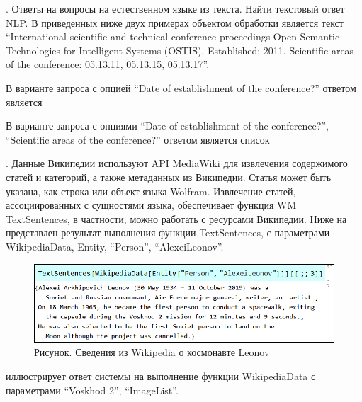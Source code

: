 .
Ответы на вопросы на естественном языке из текста. Найти текстовый ответ NLP. 
В приведенных ниже двух примерах объектом обработки является текст ``International scientific and technical conference proceedings Open Semantic Technologies for Intelligent Systems (OSTIS). Established: 2011. Scientific areas of the conference: 05.13.11, 05.13.15, 05.13.17''.

В варианте запроса с опцией ``Date of establishment of the conference?'' ответом является
\begin{center}
\end{center}
В варианте запроса с опциями ``Date of establishment of the conference?'', ``Scientific areas of the conference?'' ответом является список 
\begin{center}
\end{center}

.
Данные Википедии используют API MediaWiki для извлечения содержимого статей и категорий, а также метаданных из Википедии. Статья может быть указана, как строка или объект языка Wolfram. 
Извлечение статей, ассоциированных с сущностями языка, обеспечивает функция WM TextSentences, в частности, можно работать с ресурсами Википедии. 
Ниже на \textit{} представлен результат выполнения функции TextSentences, с параметрами WikipediaData, Entity, ``Person'', ``AlexeiLeonov''.
 
\begin{figure}[H]
	\centering
	\includegraphics[scale=0.55]{images/part7/chapter_integration/integr_alg6.png}
	\caption{Рисунок. Сведения из Wikipedia о космонавте Leonov}
	\label{fig:integr_alg6}
\end{figure}

\textit{} иллюстрирует ответ системы на выполнение функции WikipediaData с параметрами ``Voskhod 2'', ``ImageList''.

